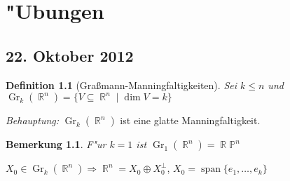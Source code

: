 \documentclass[paper=A4, twoside, chapterprefix=true, bibliography=totoc, headsepline]{scrbook}
\renewcommand{\thesection}{\arabic{section}}
\renewcommand*{\sectionmarkformat}{\thesection\autodot\enskip}
\DeclareMathOperator{\R}{\mathbb{R}}
\renewcommand{\P}{\ensuremath{\mathbb{P}}}
\DeclareMathOperator{\mspan}{span}  %
\DeclareMathOperator{\Gr}{Gr}
\theoremstyle{plain}
\theoremstyle{nonumberplain}
\newtheorem{dfn}{Definition}
\newtheorem{bem}{Bemerkung}
\theoremstyle{empty}
\theoremstyle{break}
\begin{document}



\appendix


\renewcommand*{\othersectionlevelsformat}[3]{\ifstr{#1}{section}{\"Ubung\ #3\ vom\ }{#3\autodot\enskip}}

\renewcommand*{\sectionmarkformat}{\"Ubung \thesection\autodot\ vom\enskip}


\chapter{"Ubungen}
\setcounter{section}{-1}

\section{22. Oktober 2012}
\setcounter{Aufg}{0} %
\setcounter{Loes}{0}

\begin{dfn}[Gra\ss mann-Manningfaltigkeiten]
Sei $k \le n$ und $\Gr_k(\R^n) = \{ V \subseteq \R^n \mid \dim V = k\}$
\end{dfn}

\emph{Behauptung:} $\Gr_k(\R^n)$ ist eine glatte Manningfaltigkeit.

\begin{bem}
F"ur $k = 1$ ist $\Gr_1(\R^n) = \R \P^n$
\end{bem}

$X_0 \in \Gr_k(\R^n) \Rightarrow \R^n = X_0 \oplus X_0^\perp$, $X_0 = \mspan\{e_1,\ldots ,e_k\}$ 
\end{document}
